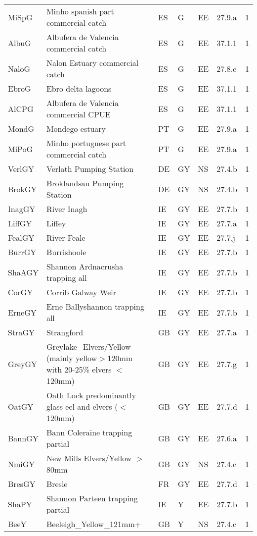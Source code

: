 \begin{table}[htbp]
\begin{tabularx}{\textwidth}{p{1.3cm}p{6.5cm}p{1cm}p{1cm}p{1cm}p{1cm}p{1.4cm}}
  MiSpG & Minho spanish part commercial catch & ES & G & EE & 27.9.a &   1 \\ 
  AlbuG & Albufera de Valencia commercial catch & ES & G & EE & 37.1.1 &   1 \\ 
  NaloG & Nalon Estuary commercial catch & ES & G & EE & 27.8.c &   1 \\ 
  EbroG & Ebro delta lagoons & ES & G & EE & 37.1.1 &   1 \\ 
  AlCPG & Albufera de Valencia commercial CPUE & ES & G & EE & 37.1.1 &   1 \\ 
  MondG & Mondego estuary & PT & G & EE & 27.9.a &   1 \\ 
  MiPoG & Minho portuguese part commercial catch & PT & G & EE & 27.9.a &   1 \\ 
  VerlGY & Verlath Pumping Station & DE & GY & NS & 27.4.b &   1 \\ 
  BrokGY & Broklandsau Pumping Station & DE & GY & NS & 27.4.b &   1 \\ 
  InagGY & River Inagh & IE & GY & EE & 27.7.b &   1 \\ 
  LiffGY & Liffey & IE & GY & EE & 27.7.a &   1 \\ 
  FealGY & River Feale & IE & GY & EE & 27.7.j &   1 \\ 
  BurrGY & Burrishoole & IE & GY & EE & 27.7.b &   1 \\ 
  ShaAGY & Shannon Ardnacrusha trapping all & IE & GY & EE & 27.7.b &   1 \\ 
  CorGY & Corrib Galway Weir & IE & GY & EE & 27.7.b &   1 \\ 
  ErneGY & Erne Ballyshannon trapping all & IE & GY & EE & 27.7.b &   1 \\ 
  StraGY & Strangford & GB & GY & EE & 27.7.a &   1 \\ 
  GreyGY & Greylake\_Elvers/Yellow (mainly yellow$>$120mm with 20-25\% elvers $<$120mm) & GB & GY & EE & 27.7.g &   1 \\ 
  OatGY & Oath Lock predominantly glass eel and elvers ($<$120mm) & GB & GY & EE & 27.7.d &   1 \\ 
  BannGY & Bann Coleraine trapping partial & GB & GY & EE & 27.6.a &   1 \\ 
  NmiGY & New Mills Elvers/Yellow $>$80mm & GB & GY & NS & 27.4.c &   1 \\ 
  BresGY & Bresle & FR & GY & EE & 27.7.d &   1 \\ 
  ShaPY & Shannon Parteen trapping partial & IE & Y & EE & 27.7.b &   1 \\ 
  BeeY & Beeleigh\_Yellow\_121mm+ & GB & Y & NS & 27.4.c &   1 \\ 

\end{tabularx}
\end{table}
